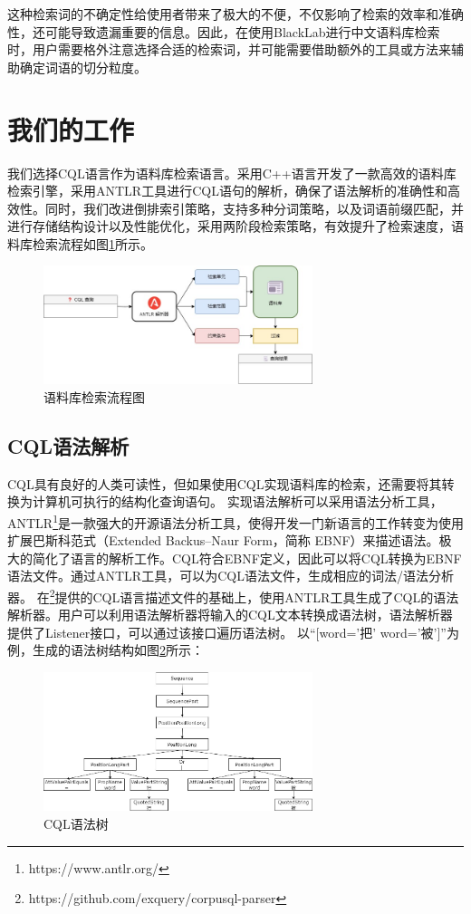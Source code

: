 \documentclass[11pt]{article}
\begin{document}
\begin{CJK*}{UTF8}{gbsn}
这种检索词的不确定性给使用者带来了极大的不便，不仅影响了检索的效率和准确性，还可能导致遗漏重要的信息。因此，在使用BlackLab进行中文语料库检索时，用户需要格外注意选择合适的检索词，并可能需要借助额外的工具或方法来辅助确定词语的切分粒度。

\section{我们的工作}

我们选择CQL语言作为语料库检索语言。采用C++语言开发了一款高效的语料库检索引擎，采用ANTLR工具进行CQL语句的解析，确保了语法解析的准确性和高效性。同时，我们改进倒排索引策略，支持多种分词策略，以及词语前缀匹配，并进行存储结构设计以及性能优化，采用两阶段检索策略，有效提升了检索速度，语料库检索流程如图\ref{fig:liucheng}所示。

\begin{figure}[!h]
	\centering
	\includegraphics[width=0.7\textwidth]{image/liuchengtu.jpg}
	\caption{语料库检索流程图}
	\label{fig:liucheng}
\end{figure}

\subsection{CQL语法解析}

CQL具有良好的人类可读性，但如果使用CQL实现语料库的检索，还需要将其转换为计算机可执行的结构化查询语句。
实现语法解析可以采用语法分析工具，ANTLR\footnote[1]{https://www.antlr.org/}是一款强大的开源语法分析工具，使得开发一门新语言的工作转变为使用扩展巴斯科范式（Extended Backus–Naur Form，简称 EBNF）来描述语法。极大的简化了语言的解析工作。CQL符合EBNF定义，因此可以将CQL转换为EBNF语法文件。通过ANTLR工具，可以为CQL语法文件，生成相应的词法/语法分析器。
在\footnote[2]{https://github.com/exquery/corpusql-parser}提供的CQL语言描述文件的基础上，使用ANTLR工具生成了CQL的语法解析器。用户可以利用语法解析器将输入的CQL文本转换成语法树，语法解析器提供了Listener接口，可以通过该接口遍历语法树。
以“[word='把' \textbar word='被']”为例，生成的语法树结构如图\ref{fig:yufashu}所示：

\begin{figure}[!h]
	\centering
	\includegraphics[width=0.7\textwidth]{image/yufashu.jpg}
	\caption{CQL语法树}
	\label{fig:yufashu}
\end{figure}


\end{CJK*}
\end{document}
